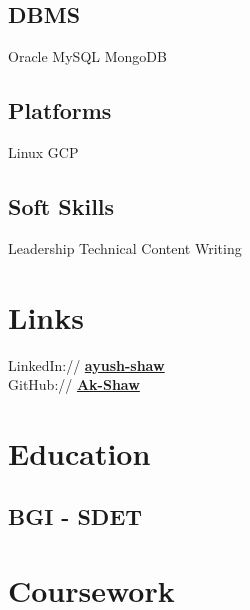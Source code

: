 \documentclass[]{deedy-resume-openfont}
\begin{document}
\begin{minipage}[t]{0.33\textwidth}
\subsection{DBMS}
Oracle \textbullet{} MySQL \textbullet{} MongoDB
\sectionsep

\subsection{Platforms}
Linux \textbullet{} GCP 
\sectionsep

\subsection{Soft Skills}
Leadership \textbullet{} Technical Content Writing 
\sectionsep


\section{Links} 
LinkedIn://  \href{https://www.linkedin.com/in/ayush-shaw}{\bf ayush-shaw} \\
GitHub://  \href{https://github.com/Ak-Shaw}{\bf Ak-Shaw} \\
\sectionsep


\section{Education} 

\subsection{BGI - SDET}
\sectionsep


\section{Coursework}


\end{minipage}
\end{document}
